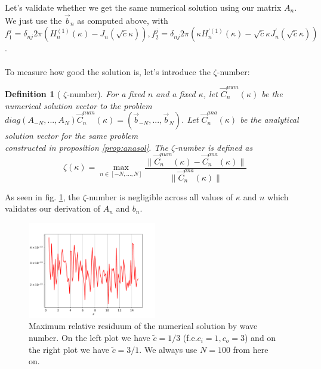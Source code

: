 \documentclass[10pt,journal,compsoc, onecolumn]{IEEEtran}
\newtheorem{definition}[theorem]{Definition}
\begin{document}
Let's validate whether we get the same numerical solution using our matrix $A_n$. 
We just use the $\vec{b}_n$ as computed above,
with $f_1^j =  \delta_{nj} 2\pi \left(H_n^{(1)}(\kappa) -  J_n(\sqrt{\tilde c} \kappa)  \right), 
f_2^j = \delta_{nj} 2\pi \left(\kappa H_n^{\prime(1)}(\kappa)
- \sqrt{\tilde c} \kappa J_n^{\prime}(\sqrt{\tilde c}\kappa) \right)$.\\
\\
To measure how good the solution is, let's introduce the $\zeta$-number: 
\begin{definition}[ $\zeta$-number]
    For a fixed $n$ and a fixed $\kappa$, let $\vec{C}^{num}_n(\kappa)$ be the numerical solution vector to the problem \\
    $diag(A_{-N}, ..., A_N) \vec{C}^{num}_n(\kappa) = (\vec{b}_{-N}, ... , \vec{b}_{N})$. 
    Let $\vec{C}^{ana}_n(\kappa)$ be the analytical solution vector for the same problem \\
    constructed in proposition \ref{prop:anasol}.
    The $\zeta$-number is defined as 
    $$
        \zeta(\kappa)=  \max\limits_{n \in [-N, ..., N]}\frac{\|\vec{C}^{num}_n(\kappa) - \vec{C}^{ana}_n(\kappa)\|}{\|\vec{C}^{ana}_n(\kappa)\|}
    $$ 
\end{definition}
As seen in fig. \ref{fig:sol_validation}, the $\zeta$-number is negligible across all values of $\kappa$ and $n$ which validates our derivation of $A_n$ and $b_n$.
\begin{figure}
    \label{fig:sol_validation}
    \includegraphics[width=0.5\textwidth]{validate_sol_c_i1,0c_o3,0N_100plotRangeStart_0,5plotRangeEnd_15,0.pdf}
    \caption{Maximum relative residuum of the numerical solution by wave number. 
    On the left plot we have $\tilde c = 1/3$ (f.e.$c_i = 1, c_o = 3$)
    and on the right plot we have $\tilde c = 3/1$.
    We always use $N = 100$ from here on.}
\end{figure}
\end{document}
